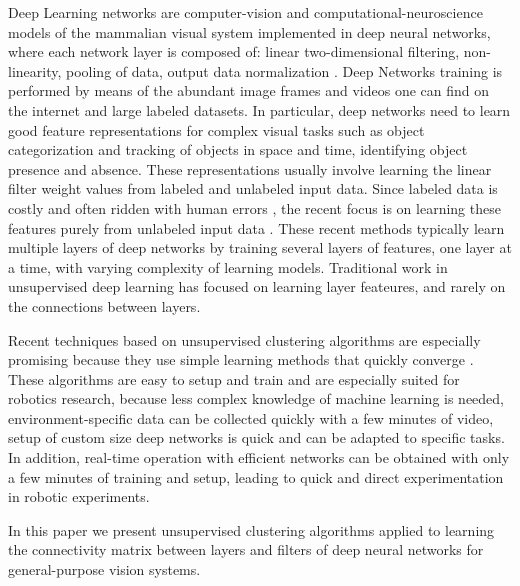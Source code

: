 \documentclass{article} %
\begin{document}
Deep Learning networks are computer-vision and computational-neuroscience models of the mammalian visual system implemented in deep neural networks, where each network layer is composed of: linear two-dimensional filtering, non-linearity, pooling of data, output data normalization \cite{jarrett_what_2009,lecun_convolutional_2010,boureau_theoretical_2010}. 
Deep Networks training is performed by means of the abundant image frames and videos one can find on the internet and large labeled datasets. In particular, deep networks need to learn good feature representations for complex visual tasks such as object categorization and tracking of objects in space and time, identifying object presence and absence. These representations usually involve learning the linear filter weight values from labeled and unlabeled input data. Since labeled data is costly and often ridden with human errors \cite{karpathy_lessons_2011, torralba_unbiased_2011, hou_meta-theory_2012}, the recent focus is on learning these features purely from unlabeled input data \cite{olshausen_emergence_1996, hyvarinen_independent_2000, hinton_fast_2006, vincent_extracting_2008, coates_analysis_2011}. These recent methods typically learn multiple layers of deep networks by training several layers of features, one layer at a time, with varying complexity of learning models. Traditional work in unsupervised deep learning has focused on learning layer feateures, and rarely on the connections between layers.

Recent techniques based on unsupervised clustering algorithms are especially promising because they use simple learning methods that quickly converge \cite{coates_analysis_2011}. 
These algorithms are easy to setup and train and are especially suited for robotics research, because less complex knowledge of machine learning is needed, environment-specific data can be collected quickly with a few minutes of video, setup of custom size deep networks is quick and can be adapted to specific tasks. %
In addition, real-time operation with efficient networks can be obtained with only a few minutes of training and setup, leading to quick and direct experimentation in robotic experiments.

In this paper we present unsupervised clustering algorithms applied to learning the connectivity matrix between layers and filters of deep neural networks for general-purpose vision systems. 
\end{document}
